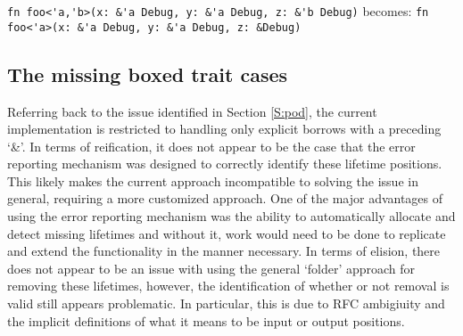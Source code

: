 \begin{fig}
{\verb|fn foo<'a,'b>(x: &'a Debug, y: &'a Debug, z: &'b Debug)|}\newline
becomes: {\verb|fn foo<'a>(x: &'a Debug, y: &'a Debug, z: &Debug)|}
\caption{Partial elision -- only 'b removed}
\label{Fig:partial}
\end{fig}


\subsection{The missing boxed trait cases}
Referring back to the issue identified in Section \ref{S:pod}, the current implementation is restricted to handling only explicit borrows with a preceding `\&'. In terms of reification, it does not appear to be the case that the error reporting mechanism was designed to correctly identify these lifetime positions. This likely makes the current approach incompatible to solving the issue in general, requiring a more customized approach. One of the major advantages of using the error reporting mechanism was the ability to automatically allocate and detect missing lifetimes and without it, work would need to be done to replicate and extend the functionality in the manner necessary. In terms of elision, there does not appear to be an issue with using the general `folder' approach for removing these lifetimes, however, the identification of whether or not removal is valid still appears problematic. In particular, this is due to RFC ambigiuity and the implicit definitions of what it means to be input or output positions.



